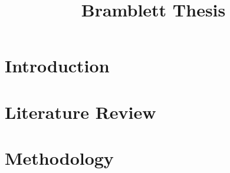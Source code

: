 \documentclass[12pt,letterpaper,oneside]{book}
\title{Bramblett Thesis}
\theoremstyle{definition}
\begin{document}
\frontmatter
	\flyleaf
    \disclaimerpage
    \titlepageAFIT
    \committeepage
    
    
    \tableofcontents
    \listoffigures
    \listoftables
\mainmatter
	\chapter{Introduction}
	
    \chapter{Literature Review}
    
    \chapter{Methodology}
    
    \appendix
    
\backmatter
	\singlespace
	
	 
	\clearpage
%
\end{document}

